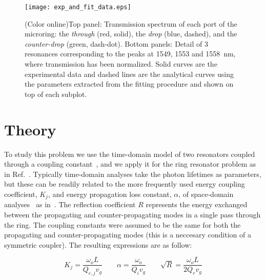 \begin{figure*}[t]
    \centering
    \texttt{[image: exp\_and\_fit\_data.eps]}
    \caption{(Color online)Top panel: Transmission spectrum of each port of the microring: the \emph{through} (red, solid), the \emph{drop} (blue, dashed), and the \emph{counter-drop} (green, dash-dot). Bottom panels: Detail of 3 resonances corresponding to the peaks at 1549, 1553 and 1558~nm, where transmission has been normalized. Solid curves are the experimental data and dashed lines are the analytical curves using the parameters extracted from the fitting procedure and shown on top of each subplot.}

    \label{fig:espectro}

\end{figure*}


\section{Theory}
\label{sec:theory}

To study this problem we use the time-domain model of two resonators coupled through a coupling constant~\cite{Haus1984}, and we apply it for the ring resonator problem as in Ref.~\cite{Zhang2008}.
Typically time-domain analyses take the photon lifetimes as parameters, but these can be readily related to the more frequently used energy coupling coefficient, $K_j$, and energy propagation loss constant, $\alpha$, of space-domain analyses~\cite{J.HeebnerR.Grover2008} as in~\cite{Little1997}. The reflection coefficient $R$ represents the energy exchanged between the propagating and counter-propagating modes in a single pass through the ring. The coupling constants were assumed to be the same for both the propagating and counter-propagating modes (this is a neccesary condition of a symmetric coupler). The resulting expressions are as follow:

\begin{equation}
    K_j=\frac{\omega_oL}{Q_{e,j} v_g}  \qquad \alpha=\frac{\omega_o}{Q_i v_g} \qquad \sqrt{R}=\frac{\omega_oL}{2Q_rv_g}
\label{eq:space-constants}
\end{equation}

